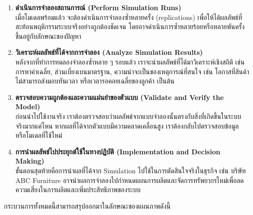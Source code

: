 \begin{enumerate}
    \item \textbf{ดำเนินการจำลองสถานการณ์ (Perform Simulation Runs)}\\
    เมื่อโมเดลพร้อมแล้ว จะต้องดำเนินการจำลองซ้ำหลายครั้ง (replications) เพื่อให้ได้ผลลัพธ์ที่สะท้อนพฤติกรรมระบบจริงอย่างถูกต้องชัดเจน โดยอาจดำเนินการซ้ำหลายร้อยหรือหลายพันครั้งขึ้นอยู่กับลักษณะของปัญหา
    
    \item \textbf{วิเคราะห์ผลลัพธ์ที่ได้จากการจำลอง (Analyze Simulation Results)}\\
    หลังจากที่ทำการทดลองจำลองซ้ำหลาย ๆ รอบแล้ว เราจะนำผลลัพธ์ที่ได้มาวิเคราะห์เชิงสถิติ เช่น การหาค่าเฉลี่ย, ส่วนเบี่ยงเบนมาตรฐาน, ความน่าจะเป็นของเหตุการณ์ที่สนใจ เช่น โอกาสที่สินค้าไม่สามารถส่งมอบทันเวลา หรือเวลารอคอยเฉลี่ยของลูกค้า เป็นต้น
    
    \item \textbf{ตรวจสอบความถูกต้องและความแม่นยำของตัวแบบ (Validate and Verify the Model)}\\
    ก่อนนำไปใช้งานจริง เราต้องตรวจสอบว่าผลลัพธ์จากแบบจำลองนั้นตรงกับสิ่งที่เกิดขึ้นในระบบจริงมากแค่ไหน หากผลที่ได้จากตัวแบบมีความคลาดเคลื่อนสูง เราต้องกลับไปตรวจสอบข้อมูลหรือโมเดลที่ใช้ใหม่
    
    \item \textbf{การนำผลลัพธ์ไปประยุกต์ใช้ในทางปฏิบัติ (Implementation and Decision Making)}\\
    ขั้นตอนสุดท้ายคือการนำผลที่ได้จาก Simulation ไปใช้ในการตัดสินใจจริงในธุรกิจ เช่น บริษัท ABC Furniture อาจนำผลการจำลองไปกำหนดแผนการผลิตและจัดการทรัพยากรใหม่เพื่อลดความเสี่ยงในการผลิตและเพิ่มประสิทธิภาพของระบบ
\end{enumerate}

กระบวนการทั้งหมดนี้สามารถสรุปออกมาในลักษณะของแผนภาพดังนี้

